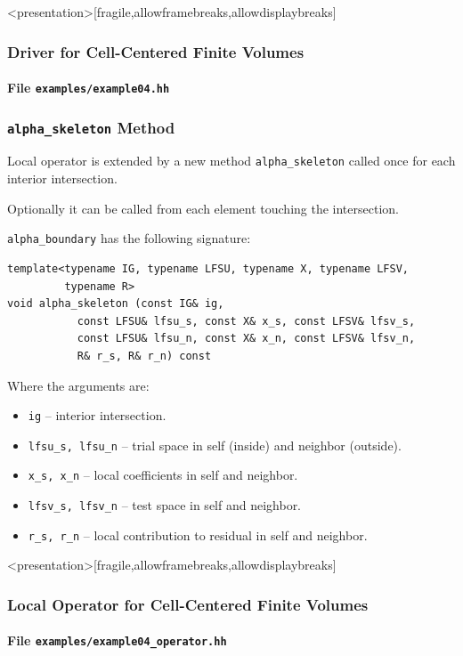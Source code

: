 \begin{frame}<presentation>[fragile,allowframebreaks,allowdisplaybreaks]
\frametitle<presentation>{Driver for Cell-Centered Finite Volumes}
\framesubtitle<presentation>{File \texttt{examples/example04.hh}}

\end{frame}

\begin{frame}[fragile]
\frametitle{\lstinline{alpha_skeleton} Method}
Local operator is extended by a new method \lstinline{alpha_skeleton}
called once for each interior intersection.

Optionally it can be called from each element touching the intersection.

\lstinline{alpha_boundary} has the following signature: 
\begin{lstlisting}[basicstyle=\ttfamily\scriptsize]
template<typename IG, typename LFSU, typename X, typename LFSV, 
         typename R>
void alpha_skeleton (const IG& ig, 
           const LFSU& lfsu_s, const X& x_s, const LFSV& lfsv_s,
           const LFSU& lfsu_n, const X& x_n, const LFSV& lfsv_n, 
           R& r_s, R& r_n) const
\end{lstlisting}
Where the arguments are:
\begin{itemize}
\item \lstinline{ig} -- interior intersection.
\item \lstinline{lfsu_s, lfsu_n} -- trial space in self (inside) and neighbor (outside).
\item \lstinline{x_s, x_n} -- local coefficients in self and neighbor.
\item \lstinline{lfsv_s, lfsv_n} -- test space in self and neighbor. 
\item \lstinline{r_s, r_n} -- local contribution to residual in self and neighbor.
\end{itemize}
\end{frame}

\begin{frame}<presentation>[fragile,allowframebreaks,allowdisplaybreaks]
\frametitle<presentation>{Local Operator for Cell-Centered Finite Volumes}
\framesubtitle<presentation>{File \texttt{examples/example04\_operator.hh}}

\end{frame}

